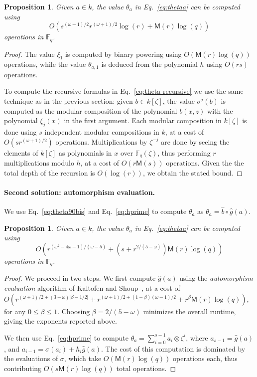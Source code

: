 \documentclass[12pt]{article}
\theoremstyle{plain}
\newtheorem{proposition}[theorem]{Proposition}
\theoremstyle{definition}
\def\F{\ensuremath{\mathbb{F}}}
\def\MM{\ensuremath{\mathsf{M}}}
\newcounter{algorithm}
\begin{document}
\begin{proposition}
  \label{prop:xitheta}
  Given $a\in k$, the value $\theta_a$ in Eq.~\eqref{eq:thetaa} can be
  computed using \[
O(s^{(\omega-1)/2}r^{(\omega+1)/2}\log(r)+\MM(r)\log(q))
\]
  operations in $\F_q$.
\end{proposition}
\begin{proof}
  The value $\xi_1$ is computed by binary powering using
  $O(\MM(r)\log(q))$ operations, while the value $\theta_{a,1}$ is
  deduced from the polynomial $h$ using $O(rs)$ operations.
  
  To compute the recursive formulas in Eq.~\eqref{eq:theta-recursive}
  we use the same technique as in the previous section:
  given $b \in k[\zeta]$, the value $\sigma^j(b)$ is computed as the
  modular composition of the polynomial $b(x,z)$ with the polynomial
  $\xi_j(x)$ in the first argument. %
  Each modular composition in $k[\zeta]$ is done using $s$ independent
  modular compositions in $k$, at a cost of $O(sr^{(\omega+1)/2})$ operations. %
  Multiplications by $\zeta^{-j}$ are done by seeing the elements of
  $k[\zeta]$ as polynomials in $x$ over $\F_q(\zeta)$, thus performing
  $r$ multiplications modulo $h$, at a cost of $O(r\MM(s))$
  operations. %
  Given the the total depth of the recursion is $O(\log(r))$, we
  obtain the stated bound.
\end{proof}

\paragraph{Second solution: automorphism evaluation.}
We use Eq.~\eqref{eq:theta90bis} and Eq.~\eqref{eq:hprime}
to compute $\theta_a$ as
$\theta_a = \hat{b}\circ \hat{g} (a)$.
\begin{proposition}
  \label{prop:ks-theta}
  Given $a\in k$, the value $\theta_a$ in Eq.~\eqref{eq:thetaa} can
  be computed using
  \[
  O(r^{(\omega^2-4\omega-1)/(\omega-5)}+(s+r^{2/(5-\omega)})\MM(r)\log(q))
  \]
  operations in $\F_q$.
\end{proposition}
\begin{proof}
  We proceed in two steps. We first compute $\hat{g}(a)$ using the
  \emph{automorphism evaluation} algorithm of Kaltofen and
  Shoup~\cite[Algorithm~AE]{kaltofen+shoup98}, at a cost of
  $O(r^{(\omega+1)/2 + (3-\omega)\lvert\beta-1/2\rvert}+
  r^{(\omega+1)/2 + (1-\beta)(\omega-1)/2}+r^\beta\MM(r)\log(q))$, for
  any $0\le\beta\le1$. Choosing $\beta=2/(5-\omega)$ minimizes the
  overall runtime, giving the exponents reported above.
  
  We then use Eq.~\eqref{eq:hprime} to compute
  $\theta_a=\sum_{i=0}^{s-1}a_i\otimes\zeta^i$, where
  $a_{s-1}=\hat{g}(a)$, and $a_{i-1}=\sigma(a_i)+h_i\hat{g}(a)$. 
  The cost of this computation is dominated by the evaluations of
  $\sigma$, which take $O(\MM(r)\log(q))$ operations each, thus
  contributing $O(s\MM(r)\log(q))$ total operations.
\end{proof}
\end{document}
